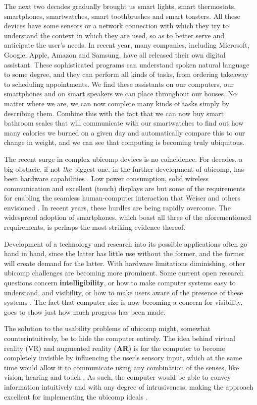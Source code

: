 The next two decades gradually brought us smart lights, smart thermostats, smartphones, smartwatches, smart toothbrushes and smart toasters. All these devices have some sensors or a network connection with which they try to understand the context in which they are used, so as to better serve and anticipate the user's needs. In recent year, many companies, including Microsoft, Google, Apple, Amazon and Samsung, have all released their own digital assistant. These sophisticated programs can understand spoken natural language to some degree, and they can perform all kinds of tasks, from ordering takeaway to scheduling appointments. We find these assistants on our computers, our smartphones and on smart speakers we can place throughout our houses. No matter where we are, we can now complete many kinds of tasks simply by describing them. Combine this with the fact that we can now buy smart bathroom scales that will communicate with our smartwatches to find out how many calories we burned on a given day and automatically compare this to our change in weight, and we can see that computing is becoming truly ubiquitous.

The recent surge in complex ubicomp devices is no coincidence. For decades, a big obstacle, if not \textit{the} biggest one, in the further development of ubicomp, has been hardware capabilities \cite{abowd2000charting}. Low power consumption, solid wireless communication and excellent (touch) displays are but some of the requirements for enabling the seamless human-computer interaction that Weiser and others envisioned \cite{weiser1993some}. In recent years, these hurdles are being rapidly overcome. The widespread adoption of smartphones, which boast all three of the aforementioned requirements, is perhaps the most striking evidence thereof.

Development of a technology and research into its possible applications often go hand in hand, since the latter has little use without the former, and the former will create demand for the latter. With hardware limitations diminishing, other ubicomp challenges are becoming more prominent. Some current open research questions concern \textbf{intelligibility}, or how to make computer systems easy to understand, and visibility, or how to make users aware of the presence of these systems \cite{vermeulen2009bet,vermeulen2013intelligibility}. The fact that computer size is now becoming a concern for visibility, goes to show just how much progress has been made.

The solution to the usability problems of ubicomp might, somewhat counterintuitively, be to hide the computer entirely. The idea behind virtual reality (VR) and augmented reality (\textbf{AR}) is for the computer to become completely invisible by influencing the user's sensory input, which at the same time would allow it to communicate using any combination of the senses, like vision, hearing and touch \cite{rheingold1991virtual}. As such, the computer would be able to convey information intuitively and with any degree of intrusiveness, making the approach excellent for implementing the ubicomp ideals \cite{weiser1993some}.


